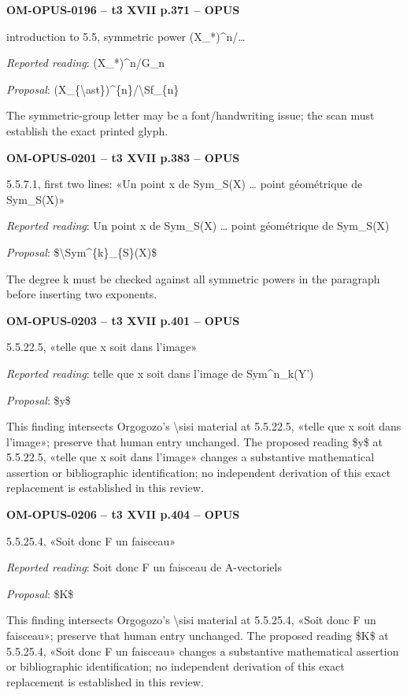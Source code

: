 \par\noindent\textbf{OM-OPUS-0196 -- t3 XVII p.371 -- OPUS}\par
introduction to 5.5, symmetric power (X\_*)\textasciicircum{}n/…\par
\emph{Reported reading}: (X\_*)\textasciicircum{}n/G\_n\par
\emph{Proposal}: (X\_\{\textbackslash{}ast\})\textasciicircum{}\{n\}/\textbackslash{}Sf\_\{n\}\par
The symmetric-group letter may be a font/handwriting issue; the scan must establish the exact printed glyph.\par
\par\noindent\textbf{OM-OPUS-0201 -- t3 XVII p.383 -- OPUS}\par
5.5.7.1, first two lines: «Un point x de Sym\_S(X) … point géométrique de Sym\_S(X)»\par
\emph{Reported reading}: Un point x de Sym\_S(X) … point géométrique de Sym\_S(X)\par
\emph{Proposal}: \$\textbackslash{}Sym\textasciicircum{}\{k\}\_\{S\}(X)\$\par
The degree k must be checked against all symmetric powers in the paragraph before inserting two exponents.\par
\par\noindent\textbf{OM-OPUS-0203 -- t3 XVII p.401 -- OPUS}\par
5.5.22.5, «telle que x soit dans l'image»\par
\emph{Reported reading}: telle que x soit dans l'image de Sym\textasciicircum{}n\_k(Y')\par
\emph{Proposal}: \$y\$\par
This finding intersects Orgogozo's \textbackslash{}sisi material at 5.5.22.5, «telle que x soit dans l'image»; preserve that human entry unchanged. The proposed reading \$y\$ at 5.5.22.5, «telle que x soit dans l'image» changes a substantive mathematical assertion or bibliographic identification; no independent derivation of this exact replacement is established in this review.\par
\par\noindent\textbf{OM-OPUS-0206 -- t3 XVII p.404 -- OPUS}\par
5.5.25.4, «Soit donc F un faisceau»\par
\emph{Reported reading}: Soit donc F un faisceau de A-vectoriels\par
\emph{Proposal}: \$K\$\par
This finding intersects Orgogozo's \textbackslash{}sisi material at 5.5.25.4, «Soit donc F un faisceau»; preserve that human entry unchanged. The proposed reading \$K\$ at 5.5.25.4, «Soit donc F un faisceau» changes a substantive mathematical assertion or bibliographic identification; no independent derivation of this exact replacement is established in this review.\par

